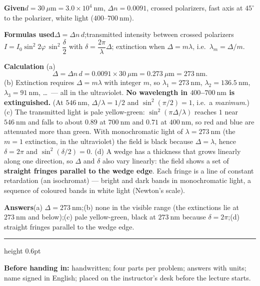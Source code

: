 \documentclass[10.5pt]{ctexart}
\begin{document}

\textbf{Given}\quad $d=30\ \mu\mathrm{m}=3.0\times10^{4}\ \mathrm{nm}$, $\Delta n=0.0091$, crossed polarizers,
fast axis at $45^{\circ}$ to the polarizer, white light ($400$--$700\ \mathrm{nm}$).

\textbf{Formulas used}\quad $\Delta=\Delta n\,d$;\quad transmitted intensity between crossed polarizers
$I=I_0\sin^{2}2\varphi\,\sin^{2}\dfrac{\delta}{2}$ with $\delta=\dfrac{2\pi}{\lambda}\Delta$;\quad
extinction when $\Delta=m\lambda$, i.e.\ $\lambda_m=\Delta/m$.

\textbf{Calculation}\quad
(a)
\begin{equation*}
\Delta=\Delta n\,d=0.0091\times30\ \mu\mathrm{m}=0.273\ \mu\mathrm{m}=273\ \mathrm{nm}.
\end{equation*}
(b) Extinction requires $\Delta=m\lambda$ with integer $m$, so $\lambda_1=273\ \mathrm{nm}$,
$\lambda_2=136.5\ \mathrm{nm}$, $\lambda_3=91\ \mathrm{nm}$, \dots\ — all in the ultraviolet.
\textbf{No wavelength in $400$--$700\ \mathrm{nm}$ is extinguished.} (At $546\ \mathrm{nm}$,
$\Delta/\lambda=1/2$ and $\sin^{2}(\pi/2)=1$, i.e.\ a \emph{maximum}.)
(c) The transmitted light is pale yellow-green: $\sin^{2}(\pi\Delta/\lambda)$ reaches $1$ near
$546\ \mathrm{nm}$ and falls to about $0.89$ at $700\ \mathrm{nm}$ and $0.71$ at $400\ \mathrm{nm}$, so red and
blue are attenuated more than green. With monochromatic light of $\lambda=273\ \mathrm{nm}$ (the $m=1$
extinction, in the ultraviolet) the field is black because $\Delta=\lambda$, hence $\delta=2\pi$ and
$\sin^{2}(\delta/2)=0$.
(d) A wedge has a thickness that grows linearly along one direction, so $\Delta$ and $\delta$ also vary
linearly: the field shows a set of \textbf{straight fringes parallel to the wedge edge}. Each fringe is a line
of constant retardation (an isochromat) — bright and dark bands in monochromatic light, a sequence of coloured
bands in white light (Newton's scale).

\textbf{Answers}\quad (a) $\Delta=273\ \mathrm{nm}$;\qquad (b) none in the visible range (the extinctions lie
at $273\ \mathrm{nm}$ and below);\qquad (c) pale yellow-green, black at $273\ \mathrm{nm}$ because
$\delta=2\pi$;\qquad (d) straight fringes parallel to the wedge edge.

\vspace{4pt}
{\color{petal}\hrule height 0.6pt}
{\small\color{inkgray}\textbf{Before handing in:} handwritten; four parts per problem; answers with units;
name signed in English; placed on the instructor's desk before the lecture starts.}
\end{document}
